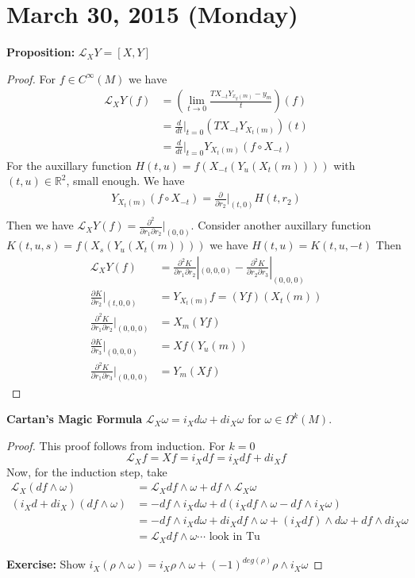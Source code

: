 \documentclass{article}
\newcommand\Lie{\mathcal{L}}
\begin{document}
\section{March 30, 2015 (Monday)}
\textbf{Proposition:} $\mathcal{L}_XY = [X,Y]$
\begin{proof}
For $f \in C^\infty(M)$ we have
\begin{align*}
\mathcal{L}_XY(f) & = (\lim_{t \to 0} \frac{TX_{-t}Y_{x_y(m)} - y_m}{t})(f) \\
& = \frac{d}{dt}|_{t=0}(TX_{-t}Y_{X_t(m)})(t) \\
& = \frac{d}{dt}|_{t=0}Y_{X_t(m)}(f \circ X_{-t})
\end{align*}
For the auxillary function $H(t,u) = f(X_{-t}(Y_u(X_t(m))))$ with $(t,u) \in \mathbb{R}^2$, small enough. We have
\begin{align*}
Y_{X_t(m)}(f \circ X_{-t}) = \frac{\partial}{\partial r_2}|_{(t,0)}H(t,r_2) \\
\end{align*}
Then we have $\mathcal{L}_XY(f) = \frac{\partial^2}{\partial r_1 \partial r_2}|_{(0,0)}$. Consider another auxillary function $K(t,u,s) = f(X_s(Y_u(X_t(m))))$ we have $H(t,u) = K(t,u,-t)$
Then
\begin{align*}
\mathcal{L}_XY(f) & = \frac{\partial^2 K}{\partial r_1 \partial r_2}|_{(0,0,0)} - \frac{\partial^2 K}{\partial r_2 \partial r_3}|_{(0,0,0)} \\
\frac{\partial K}{\partial r_2}|_{(t,0,0)}& = Y_{X_t(m)}f = (Yf)(X_t(m)) \\
\frac{\partial^2 K}{\partial r_1 \partial r_2}|_{(0,0,0)} & = X_m(Yf) \\
\frac{\partial K}{\partial r_3}|_{(0,0,0)} & = Xf(Y_u(m)) \\
\frac{\partial^2 K}{\partial r_1 \partial r_3}|_{(0,0,0)} &= Y_m(Xf) 
\end{align*}
\end{proof}

\textbf{Cartan's Magic Formula} $\mathcal{L}_X \omega = i_X d \omega + d i_X \omega$ for $\omega \in \Omega^k(M)$.
\begin{proof}
This proof follows from induction. For $k = 0$
\[
\mathcal{L}_Xf = Xf = i_X df = i_X df + d i_X f
\]
Now, for the induction step, take
\begin{align*}
\mathcal{L}_X(df \wedge \omega) & = \Lie_Xdf \wedge \omega + df \wedge \Lie_X \omega \\
(i_Xd + di_X)(df \wedge \omega) & = -df \wedge i_Xd\omega + d(i_Xdf \wedge \omega - df \wedge i_X \omega) \\ 
& = - df \wedge i_X d \omega + d i_X df \wedge \omega + (i_Xdf)\wedge d \omega + df \wedge di_X\omega \\
& = \Lie_X df \wedge \omega  \cdots \text{ look in Tu }
\end{align*}

\textbf{Exercise:} Show $i_X(\rho \wedge \omega) = i_X \rho \wedge \omega + (-1)^{deg(\rho)} \rho \wedge i_X \omega$
\end{proof}
\end{document}
